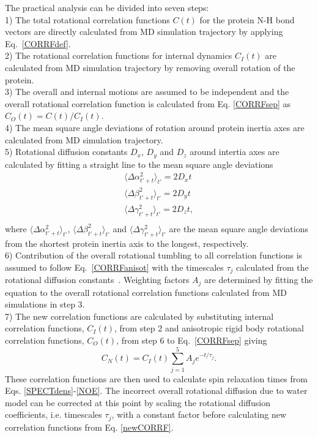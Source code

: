 \documentclass[pre,aps,floatfix,authordate1-4,twocolumn]{revtex4-1}
\begin{document}
The practical analysis can be divided into seven steps: \\
1) The total rotational correlation functions $C(t)$
for the protein N-H bond vectors are directly calculated from MD simulation trajectory
by applying Eq.~\ref{CORRFdef}. \\
2) The rotational correlation functions for internal
dynamics $C_I(t)$ are calculated from MD simulation trajectory
by removing overall rotation of the protein. \\
3) The overall and internal motions are assumed to be independent and the overall
rotational correlation function is calculated from Eq. \ref{CORRFsep} as $C_O(t)=C(t)/C_I(t)$. \\
4) The mean square angle deviations of rotation around protein inertia axes
are calculated from MD simulation trajectory. \\
5) Rotational diffusion constants $D_x$, $D_y$ and $D_z$ around intertia axes
are calculated by fitting a straight line to the mean square angle deviations 
\begin{equation}\label{DIFFdef}
  \begin{aligned}
    \langle \Delta \alpha_{t'+t}^2 \rangle_{t'} = 2 D_{x} t \\
    \langle \Delta \beta_{t'+t}^2 \rangle_{t'} = 2 D_{y} t \\
    \langle \Delta \gamma_{t'+t}^2 \rangle_{t'} = 2 D_{z} t, \\
  \end{aligned}
\end{equation}
where $\langle \Delta \alpha_{t'+t}^2 \rangle_{t'}$,
$\langle \Delta \beta_{t'+t}^2 \rangle_{t'}$ and
$\langle \Delta \gamma_{t'+t}^2 \rangle_{t'}$ are
the mean square angle deviations from the shortest protein
inertia axis to the longest, respectively.\\
6) Contribution of the overall rotational tumbling to all correlation
functions is assumed to follow Eq.~\ref{CORRFanisot} with the
timescales $\tau_j$ calculated from the rotational diffusion constants~\cite{Note1}.
Weighting factors $A_j$ are determined by fitting the equation %
to the overall rotational correlation functions calculated from MD simulations in step 3. \\
7) The new correlation functions are calculated by substituting
internal correlation functions, $C_I(t)$, from step 2 and anisotropic rigid body
rotational correlation functions, $C_O(t)$, from step 6 to
Eq.~\ref{CORRFsep} giving
\begin{equation}\label{newCORRF}
  C_N(t)=C_I(t)\sum_{j=1}^5 A_j e^{-t/\tau_j}.
\end{equation}
These correlation functions are then used to calculate spin relaxation times
from Eqs. \ref{SPECTdens}-\ref{NOE}. The incorrect overall rotational
diffusion due to water model can be corrected at this point  by scaling the rotational diffusion
coefficients, i.e. timescales $\tau_j$, with a constant factor before calculating
new correlation functions from Eq. \ref{newCORRF}.
\end{document}
